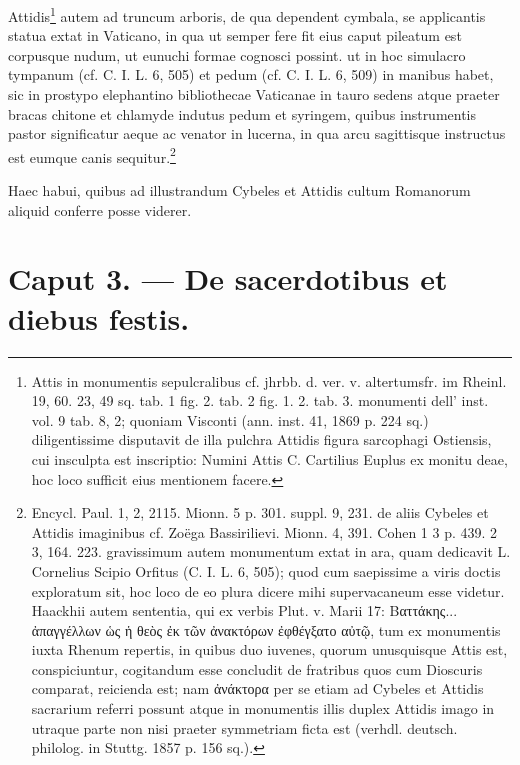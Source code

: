 \documentclass[a4paper, 11pt, oneside, polutonikogreek, german]{article}
\begin{document}
Attidis\footnote{Attis in monumentis sepulcralibus cf. jhrbb. d. ver. v. altertumsfr. im Rheinl. 19, 60. 23, 49 sq. tab. 1 fig. 2. tab. 2 fig. 1. 2. tab. 3. monumenti dell' inst. vol. 9 tab. 8, 2; quoniam Visconti (ann. inst. 41, 1869 p. 224 sq.) diligentissime disputavit de illa pulchra Attidis figura sarcophagi Ostiensis, cui insculpta est inscriptio: Numini Attis C. Cartilius Euplus ex monitu deae, hoc loco sufficit eius mentionem facere.} autem ad truncum arboris, de qua dependent cymbala, se applicantis statua extat in Vaticano, in qua ut semper fere fit eius caput pileatum est corpusque nudum, ut eunuchi formae cognosci possint. ut in hoc simulacro tympanum (cf. C. I. L. 6, 505) et pedum (cf. C. I. L. 6, 509) in manibus habet, sic in prostypo elephantino bibliothecae Vaticanae in tauro sedens atque praeter bracas chitone et chlamyde indutus pedum et syringem, quibus instrumentis pastor significatur aeque ac venator in lucerna, in qua arcu sagittisque instructus est eumque canis sequitur.\footnote{Encycl. Paul. 1, 2, 2115. Mionn. 5 p. 301. suppl. 9, 231. de aliis Cybeles et Attidis imaginibus cf. Zoëga Bassirilievi. Mionn. 4, 391. Cohen 1 3 p. 439. 2 3, 164. 223. gravissimum autem monumentum extat in ara, quam dedicavit L. Cornelius Scipio Orfitus (C. I. L. 6, 505); quod cum saepissime a viris doctis exploratum sit, hoc loco de eo plura dicere mihi supervacaneum esse videtur. Haackhii autem sententia, qui ex verbis Plut. v. Marii 17: Βαττάκης... ἀπαγγέλλων ὡς ἡ θεὸς ἐκ τῶν ἀνακτόρων ἐφθέγξατο αὐτῷ, tum ex monumentis iuxta Rhenum repertis, in quibus duo iuvenes, quorum unusquisque Attis est, conspiciuntur, cogitandum esse concludit de fratribus quos cum Dioscuris comparat, reicienda est; nam ἀνάκτορα per se etiam ad Cybeles et Attidis sacrarium referri possunt atque in monumentis illis duplex Attidis imago in utraque parte non nisi praeter symmetriam ficta est (verhdl. deutsch. philolog. in Stuttg. 1857 p. 156 sq.).}

Haec habui, quibus ad illustrandum Cybeles et Attidis cultum Romanorum aliquid conferre posse viderer.
\clearpage
\section{Caput 3. --- De sacerdotibus et diebus festis.}
\end{document}
